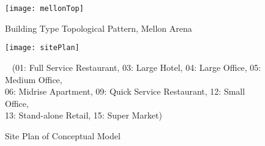 \begin{figure}[h!]
  \centering
  \texttt{[image: mellonTop]}
  \caption[Building Type Topology]{Building Type Topological Pattern, Mellon Arena}
  \label{fig:mellonTop}
\end{figure}

\begin{figure}[h!]
  \centering
  \texttt{[image: sitePlan]}
  \caption[Conceptual Model Site Plan]{Site Plan of Conceptual Model}~ (01: Full Service
  Restaurant, 03: Large Hotel, 04: Large Office, 05: Medium Office,
  \\06: Midrise Apartment, 09: Quick Service Restaurant, 12: Small
  Office, \\13: Stand-alone Retail, 15: Super Market)
  \label{fig:sitePlan}
\end{figure}